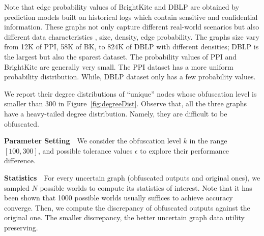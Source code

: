 Note that edge probability values of BrightKite and DBLP are obtained by prediction models built on historical logs which contain sensitive and confidential information. 
These graphs not only capture different real-world scenarios but also different data characteristics {\eg}, size, density, edge probability. 
The graphs size vary from 12K of PPI,  58K of BK, to 824K of DBLP with different densities; 
DBLP is the largest but also the sparest dataset.  
The probability values of PPI and BrightKite are generally very small. 
The PPI dataset has a more uniform probability distribution. While, DBLP dataset only has a few probability values.

We report their degree distributions of “unique” nodes whose obfuscation level is smaller than 300 in Figure~\ref{fig:degreeDist}. Observe that, all the three graphs have a heavy-tailed degree distribution. Namely, they are difficult to be obfuscated.

\textbf{Parameter Setting}~~We consider the obfuscation level $k$ in the range $[100,300]$, and possible tolerance values $\epsilon$ to explore their performance difference. 

\textbf{Statistics}~~For every uncertain graph (obfuscated outputs and original ones), we sampled $N$ possible worlds to compute its statistics of interest. Note that it has been shown that 1000 possible worlds usually suffices to achieve accuracy converge.  Then, we compute the discrepancy of obfuscated outputs against the original one. The smaller discrepancy, the better uncertain graph data utility preserving.


